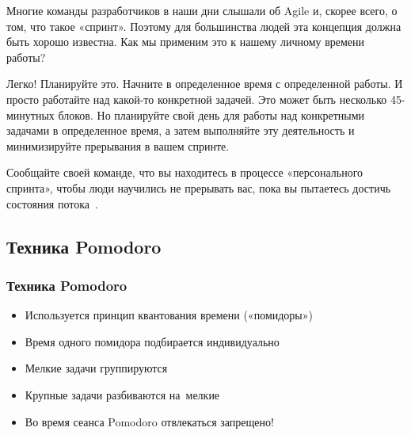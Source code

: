 \documentclass{../industrial-development}
\begin{document}


\lecturenotes

Многие команды разработчиков в наши дни слышали об Agile и, скорее всего, о том, что такое «спринт». Поэтому для большинства людей эта концепция должна быть хорошо известна. Как мы применим это к нашему личному времени работы?

Легко! Планируйте это. Начните в определенное время с определенной работы. И просто работайте над какой-то конкретной задачей. Это может быть несколько 45-минутных блоков. Но планируйте свой день для работы над конкретными задачами в определенное время, а затем выполняйте эту деятельность и минимизируйте прерывания в вашем спринте.

Сообщайте своей команде, что вы находитесь в процессе «персонального спринта», чтобы люди научились не прерывать вас, пока вы пытаетесь достичь состояния потока~\cite{TMSeimer}.

\subsection{Техника Pomodoro}

\begin{frame} \frametitle{Техника Pomodoro}
  \begin{itemize}
  \item Используется принцип квантования времени («помидоры»)
  \item Время одного помидора подбирается индивидуально
  \item Мелкие задачи группируются
  \item Крупные задачи разбиваются на~мелкие
  \item Во время сеанса Pomodoro отвлекаться запрещено!
  \end{itemize}
\end{frame}
\end{document}
